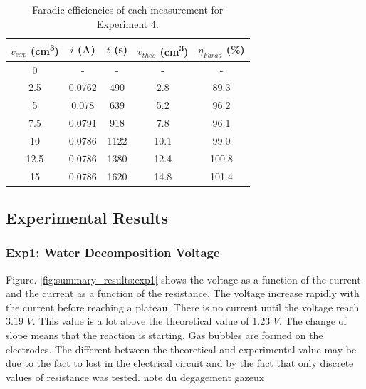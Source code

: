 \begin{table}[H]
    \centering
    \caption{Faradic efficiencies of each measurement for Experiment 4.}
    \begin{tabular}{|c|c|c|c|c|}
        \hline
        $v_{exp}$ (\si{\centi\meter\cubed}) & $i$ (\si{\ampere}) & $t$ (\si{\second}) & $v_{theo}$ (\si{\centi\meter\cubed}) & $\eta_{Farad}$ (\%) \\
        \hline
        0 & - & - & - & - \\
        \hline
        2.5 & 0.0762 & 490 & 2.8 & 89.3 \\
        \hline
        5 & 0.078 & 639 & 5.2 & 96.2 \\
        \hline
        7.5 & 0.0791 & 918 & 7.8 & 96.1 \\
        \hline
        10 & 0.0786 & 1122 & 10.1 & 99.0 \\
        \hline
        12.5 & 0.0786 & 1380 & 12.4 & 100.8 \\
        \hline
        15 & 0.0786 & 1620 & 14.8 & 101.4 \\
        \hline
    \end{tabular}
    \label{tab:eta_farad_exp4}
\end{table}

\subsection{Experimental Results}
\subsubsection{Exp1: Water Decomposition Voltage}


Figure. \ref{fig:summary_results:exp1} shows the voltage as a function of the current and the current as a function of the resistance. The voltage increase rapidly with the current before reaching a plateau. There is no current until the voltage reach 3.19 $\si{V}$. This value is a lot above the theoretical value of 1.23 $\si{V}$. 
The change of slope means that the reaction is starting. Gas bubbles are formed on the electrodes. The different between the theoretical and experimental value may be due to the fact to lost in the electrical circuit and by the fact that only discrete values of resistance was tested. {\color{red} note du degagement gazeux}

